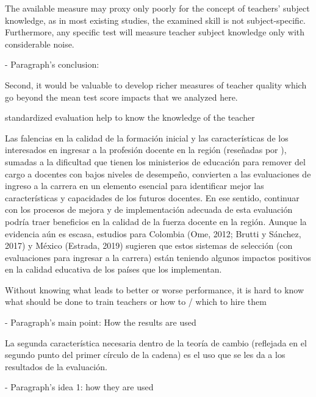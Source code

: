 The available measure may proxy only poorly for the concept of teachers' subject knowledge, as in most existing studies, the examined skill is not subject-specific. Furthermore, any specific test will measure teacher subject knowledge only with considerable noise. \citep{Metzler_et_al_2012}



- Paragraph's conclusion: 

Second, it would be valuable to develop richer measures of teacher quality which go beyond the mean test score impacts that we analyzed here. \citep{Chetty_et_al_2014a}

standardized evaluation help to know the knowledge of the teacher

\citep{Hincapie_et_al_2020}
Las falencias en la calidad de la formación inicial y las características de los interesados
en ingresar a la profesión docente en la región (reseñadas por \citep{Elacqua_et_al_2018}), sumadas a la dificultad que tienen los ministerios de educación para remover del cargo a docentes con bajos niveles de desempeño, convierten a las evaluaciones de ingreso a la carrera en un elemento esencial para identificar mejor las características y capacidades de los futuros docentes. En ese sentido, continuar con los procesos de mejora y de implementación adecuada de esta evaluación podría traer beneficios en la calidad de la fuerza docente en la región. Aunque la evidencia aún es escasa, estudios para Colombia (Ome, 2012; Brutti y Sánchez, 2017) y México (Estrada, 2019) sugieren que estos sistemas de selección (con evaluaciones para ingresar a la carrera) están teniendo algunos impactos positivos en la calidad educativa de los países que los implementan.

Without knowing what leads to better or worse performance, it is hard to know what should be done to train teachers or how to / which to hire them \citep{Hanushek_et_al_2012}





- Paragraph's main point: How the results are used

La segunda característica necesaria dentro de la teoría de cambio (reflejada en el segundo punto del primer círculo de la cadena) es el uso que se les da a los resultados de la evaluación. \citep{Hincapie_et_al_2020}


- Paragraph's idea 1: how they are used

